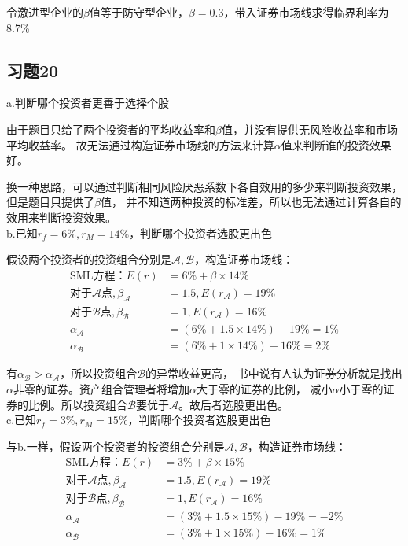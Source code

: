 \documentclass{article}
\begin{document}
令激进型企业的$\beta$值等于防守型企业，$\beta=0.3$，带入证券市场线求得临界利率为8.7\%


\clearpage

\subsection*{习题20}
a.判断哪个投资者更善于选择个股

由于题目只给了两个投资者的平均收益率和$\beta$值，并没有提供无风险收益率和市场平均收益率。
故无法通过构造证券市场线的方法来计算$\alpha$值来判断谁的投资效果好。

换一种思路，可以通过判断相同风险厌恶系数下各自效用的多少来判断投资效果，但是题目只提供了$\beta$值，
并不知道两种投资的标准差，所以也无法通过计算各自的效用来判断投资效果。\\

b.已知$r_f=6\%,r_M=14\%$，判断哪个投资者选股更出色

假设两个投资者的投资组合分别是$\mathcal{A} ,\mathcal{B} $，构造证券市场线：
\begin{align}
    \text{SML方程：}E(r)&=6\%+\beta\times 14\%\\
    \text{对于}\mathcal{A} \text{点},\beta_\mathcal{A} &=1.5,E(r_\mathcal{A} )=19\%\\
    \text{对于}\mathcal{B} \text{点},\beta_\mathcal{B} &=1,E(r_\mathcal{A} )=16\%\\
    \alpha_\mathcal{A} &=(6\%+1.5\times14\%)-19\%=1\%\\
    \alpha_\mathcal{B} &=(6\%+1\times14\%)-16\%=2\%
\end{align}

有$\alpha_\mathcal{B}>\alpha_\mathcal{A}$，所以投资组合$\mathcal{B}$的异常收益更高，
书中说有人认为证券分析就是找出$\alpha$非零的证券。资产组合管理者将增加$\alpha$大于零的证券的比例，
减小$\alpha$小于零的证券的比例。所以投资组合$\mathcal{B} $要优于$\mathcal{A}$。故后者选股更出色。\\

c.已知$r_f=3\%,r_M=15\%$，判断哪个投资者选股更出色

与b.一样，假设两个投资者的投资组合分别是$\mathcal{A} ,\mathcal{B} $，构造证券市场线：
\begin{align}
    \text{SML方程：}E(r)&=3\%+\beta\times 15\%\\
    \text{对于}\mathcal{A} \text{点},\beta_\mathcal{A} &=1.5,E(r_\mathcal{A} )=19\%\\
    \text{对于}\mathcal{B} \text{点},\beta_\mathcal{B} &=1,E(r_\mathcal{A} )=16\%\\
    \alpha_\mathcal{A} &=(3\%+1.5\times15\%)-19\%=-2\%\\
    \alpha_\mathcal{B} &=(3\%+1\times15\%)-16\%=1\%
\end{align}
\end{document}
